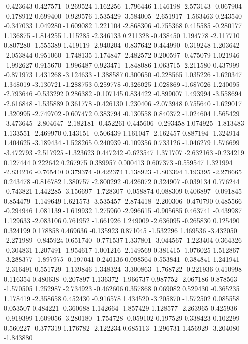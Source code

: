 -0.423643
0.427571
-0.269524
1.162256
-1.796446
1.146198
-2.573143
-0.067904
-0.178912
0.699400
-0.929576
1.535429
-3.584005
-2.651917
-1.563463
0.243540
-0.347033
1.049280
-1.609082
1.221104
-2.868306
-0.755368
0.415585
-0.280177
1.136875
-1.814255
1.115285
-2.346133
0.211328
-0.438450
1.194778
-2.117710
0.807280
-1.555389
1.419119
-2.940204
-0.837642
0.444990
-0.319248
1.203642
-2.053844
0.951060
-1.748135
1.174847
-2.482572
0.200597
-0.475079
1.021946
-1.992627
0.915670
-1.996487
0.923471
-1.848086
1.063715
-2.211580
0.437999
-0.871973
1.431268
-3.124633
-1.388587
0.300650
-0.228565
1.035226
-1.620347
1.348019
-3.130721
-1.288753
0.259778
-0.326025
1.028869
-1.687026
1.240095
-2.793646
-0.533292
0.286382
-0.107145
0.834422
-0.899007
1.493994
-3.558694
-2.616848
-1.535889
0.361778
-0.426130
1.230406
-2.073948
0.755640
-1.629017
1.320995
-2.749702
-0.607472
0.383794
-0.130558
0.840372
-1.024604
1.565429
-3.473645
-2.804647
-2.182181
-0.452261
0.445606
-0.293458
1.074925
-1.813483
1.133551
-2.469970
0.143151
-0.506439
1.161047
-2.162457
0.887194
-1.324914
1.404625
-3.189434
-1.528265
0.240939
-0.109356
0.733126
-1.046279
1.576699
-3.472793
-2.517925
-1.323623
0.447242
-0.623547
1.371707
-2.632163
-0.234219
0.127444
0.222642
0.267975
0.389957
0.000413
0.607373
-0.559547
1.321994
-2.834216
-0.765440
0.379374
-0.422374
1.138923
-1.803394
1.193395
-2.278665
0.243478
-0.816782
1.380757
-2.800292
-0.426072
0.324907
-0.039134
0.776244
-0.743821
1.442285
-3.156697
-1.728307
-0.058874
0.088309
0.406897
-0.091845
0.854479
-1.149649
1.621573
-3.535457
-2.874418
-2.200306
-0.470790
0.485566
-0.294946
1.081139
-1.619932
1.275960
-2.996615
-0.905685
0.463741
-0.439987
1.129633
-2.083106
0.761952
-1.661926
1.249009
-2.636095
-0.265830
0.125490
0.324199
0.178858
0.469636
-0.135923
0.871045
-1.532296
1.469536
-3.432050
-2.271989
-0.845924
0.651740
-0.771537
1.337801
-3.044567
-1.223404
0.364326
-0.304831
1.207491
-1.954617
1.001216
-2.149569
0.381415
-1.076025
1.512867
-3.288377
-1.897975
-0.197041
0.240136
0.098564
0.553841
-0.384841
1.241941
-2.316491
0.551729
-1.139846
1.348324
-3.300863
-1.768722
-0.221936
0.410998
0.116354
0.480638
-0.207897
1.136372
-1.966737
0.987752
-2.067186
0.878563
-1.570505
1.252987
-2.734923
-0.462606
0.357868
0.069082
0.529430
-0.365235
1.178419
-2.358658
0.452430
-0.916578
1.434520
-3.205870
-1.572502
0.085558
0.053507
0.484221
-0.360688
1.142664
-1.857429
1.128577
-2.263965
0.425936
-0.919399
1.609056
-3.280180
-1.754728
-0.059102
0.197529
0.338423
0.102299
0.560227
-0.377319
1.176782
-2.122234
0.685113
-1.296731
1.456929
-3.204080
-1.843880
